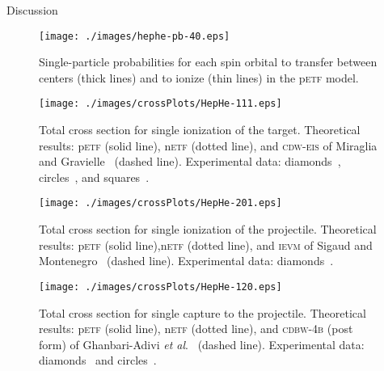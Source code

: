 \documentclass[aps, pra, reprint, groupedaddress, amsfonts, longbibliography,
               amsmath, amssymb, showpacs, nofootinbib]{revtex4-1}
\begin{document}
\begin{section}{Discussion \label{sec:disc}}

   \begin{figure}[t]
      \centering
      \texttt{[image: ./images/hephe-pb-40.eps]}
      \caption{Single-particle probabilities for each spin orbital to transfer between
               centers (thick lines) and to ionize (thin lines) in the p\textsc{etf} model.
               \label{fig:pbPlot}}
   \end{figure}

   \begin{figure}[t]
      \centering
      \texttt{[image: ./images/crossPlots/HepHe-111.eps]}
      \caption{Total cross section for single ionization of the target.
               Theoretical results: p\textsc{etf} (solid line), n\textsc{etf} (dotted line), and
                                    \textsc{cdw-eis} of Miraglia and Gravielle~\cite{MG-10}
                                    (dashed line).
               Experimental data: diamonds~\cite{Dub-89}, circles~\cite{FTFHLP-95}, and
                                  squares~\cite{DT-88}. \label{fig:cs111}}
   \end{figure}

   \begin{figure}[t]
      \centering
      \texttt{[image: ./images/crossPlots/HepHe-201.eps]}
      \caption{Total cross section for single ionization of the projectile.
               Theoretical results: p\textsc{etf} (solid line),n\textsc{etf} (dotted line), and
                                    \textsc{ievm} of Sigaud and Montenegro~\cite{SM-03} (dashed line).
               Experimental data: diamonds~\cite{Dub-89}. \label{fig:cs201}}
   \end{figure}

   \begin{figure}[t]
      \centering
      \texttt{[image: ./images/crossPlots/HepHe-120.eps]}
      \caption{Total cross section for single capture to the projectile.
               Theoretical results: p\textsc{etf} (solid line), n\textsc{etf} (dotted line), and
                                    \textsc{cdbw-4b} (post form) of Ghanbari-Adivi
                                    \textit{et al}.~\cite{GAG15} (dashed line).
               Experimental data: diamonds~\cite{Dub-89} and circles~\cite{FTFHLP-95}. \label{fig:cs120}}
   \end{figure}


\end{section}
\end{document}
